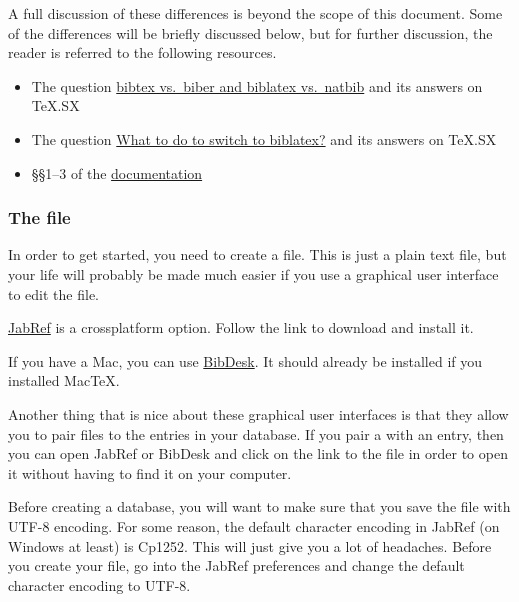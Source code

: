 A full discussion of these differences is beyond the scope of this document.
Some of the differences will be briefly discussed below, but for further discussion, the reader is referred to the following resources.

\begin{itemize}

	\item{The question \href{http://tex.stackexchange.com/q/25701/32888}{bibtex vs.~biber and biblatex vs.~natbib} and its answers on TeX.SX}
	
	\item{The question \href{http://tex.stackexchange.com/q/5091/32888}{What to do to switch to biblatex?} and its answers on TeX.SX}
	
	\item{\S\S1--3 of the \href{http://texdoc.net/texmf-dist/doc/latex/biblatex/biblatex.pdf}{ documentation}}

\end{itemize}

\subsubsection{The  file}
\label{subsubsec:the-bib-file}

In order to get started, you need to create a  file.
This is just a plain text file, but your life will probably be made much easier if you use a graphical user interface to edit the file.

\href{http://jabref.sourceforge.net/}{JabRef} is a crossplatform option.
Follow the link to download and install it.

If you have a Mac, you can use \href{http://bibdesk.sourceforge.net/}{BibDesk}.
It should already be installed if you installed {Mac\TeX}.

Another thing that is nice about these graphical user interfaces is that they allow you to pair  files to the entries in your database.
If you pair a  with an entry, then you can open JabRef or BibDesk and click on the link to the  file in order to open it without having to find it on your computer.

Before creating a database, you will want to make sure that you save the  file with UTF-8 encoding.
For some reason, the default character encoding in JabRef (on Windows at least) is Cp1252.
This will just give you a lot of headaches.
Before you create your  file, go into the JabRef preferences and change the default character encoding to UTF-8.

